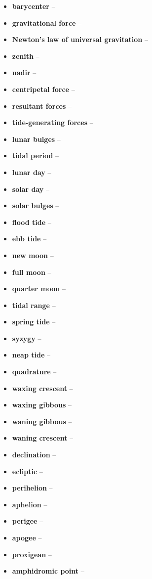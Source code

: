 \begin{itemize}
    \item \textbf{barycenter} --
    \item \textbf{gravitational force} --
    \item \textbf{Newton's law of universal gravitation} --
    \item \textbf{zenith} --
    \item \textbf{nadir} --
    \item \textbf{centripetal force} --
    \item \textbf{resultant forces} --
    \item \textbf{tide-generating forces} --
    \item \textbf{lunar bulges} --
    \item \textbf{tidal period} --
    \item \textbf{lunar day} --
    \item \textbf{solar day} --
    \item \textbf{solar bulges} --
    \item \textbf{flood tide} --
    \item \textbf{ebb tide} --
    \item \textbf{new moon} --
    \item \textbf{full moon} --
    \item \textbf{quarter moon} --
    \item \textbf{tidal range} --
    \item \textbf{spring tide} --
    \item \textbf{syzygy} --
    \item \textbf{neap tide} --
    \item \textbf{quadrature} --
    \item \textbf{waxing crescent} --
    \item \textbf{waxing gibbous} --
    \item \textbf{waning gibbous} --
    \item \textbf{waning crescent} --
    \item \textbf{declination} --
    \item \textbf{ecliptic} --
    \item \textbf{perihelion} --
    \item \textbf{aphelion} --
    \item \textbf{perigee} --
    \item \textbf{apogee} --
    \item \textbf{proxigean} --
    \item \textbf{amphidromic point} --

\end{itemize}
